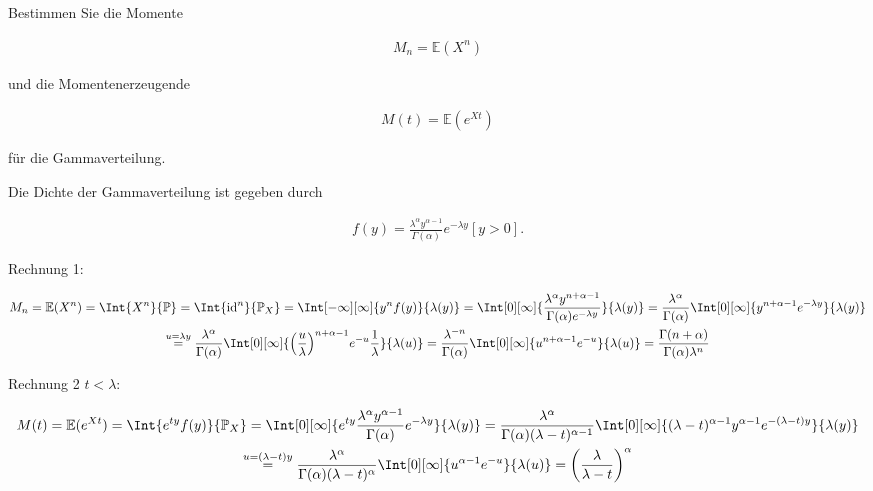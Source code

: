 \begin{exercise}

Bestimmen Sie die Momente

\begin{align*}
  M_n = \mathbb{E}(X^n)
\end{align*}

und die Momentenerzeugende

\begin{align*}
  M(t) = \mathbb{E}(e^{Xt})
\end{align*}

für die Gammaverteilung.

\end{exercise}

\begin{solution}

Die Dichte der Gammaverteilung ist gegeben durch

\begin{align*}
  f(y) =
  \frac
  {
    \lambda^\alpha
    y^{\alpha - 1}
  }{
    \Gamma(\alpha)
  }
  e^{-\lambda y}
  [y > 0].
\end{align*}

Rechnung 1:

\begin{multline*}
  M_n
  = \E(X^n)
  = \Int{X^n}{\P}
  = \Int{\id^n}{\P_X}
  = \Int[-\infty][\infty]{y^n f(y)}{\lambda(y)}
  = \Int[0][\infty]
  {
    \frac
    {\lambda^\alpha y^{n + \alpha - 1}}
    {
      \Gamma(\alpha)
      e^{-\lambda y}
    }
  }{\lambda(y)}
  = \frac
    {\lambda^\alpha}
    {\Gamma(\alpha)}
    \Int[0][\infty]
    {
      y^{n + \alpha - 1}
      e^{-\lambda y}
    }
    {\lambda(y)} \\
  \stackrel{u = \lambda y}{=}
    \frac
    {\lambda^\alpha}
    {\Gamma(\alpha)}
    \Int[0][\infty]
    {
      \pbraces{\frac{u}{\lambda}}^{n + \alpha - 1}
      e^{-u}
      \frac{1}{\lambda}
    }
    {\lambda(u)}
  = \frac{\lambda^{-n}}{\Gamma(\alpha)}
    \Int[0][\infty]{u^{n + \alpha - 1} e^{-u}}{\lambda(u)}
  = \frac
    {\Gamma(n + \alpha)}
    {\Gamma(\alpha)\lambda^n}
\end{multline*}

Rechnung 2 $t < \lambda$:

\begin{multline*}
  M(t)
  = \E(e^{Xt})
  = \Int{e^{ty} f(y)}{\P_X}
  = \Int[0][\infty]
    {
      e^{ty}
      \frac
      {\lambda^\alpha y^{\alpha -1}}
      {\Gamma(\alpha)}
      e^{-\lambda y}
    }
    {\lambda(y)}
  = \frac
    {\lambda^\alpha}
    {
      \Gamma(\alpha)
      (\lambda - t)^{\alpha - 1}
    }
    \Int[0][\infty]
    {
      (\lambda - t)^{\alpha - 1}
      y^{\alpha - 1}
      e^{-(\lambda - t) y}
    }
    {\lambda(y)} \\
  \stackrel{u = (\lambda - t) y}{=}
    \frac
    {\lambda^\alpha}
    {
      \Gamma(\alpha)
      (\lambda - t)^\alpha
    }
    \Int[0][\infty]
    {
      u^{\alpha - 1}
      e^{-u}
    }
    {\lambda(u)}
  = \pbraces
    {
      \frac
      {\lambda}
      {\lambda-t}
    }^\alpha
\end{multline*}

\end{solution}

